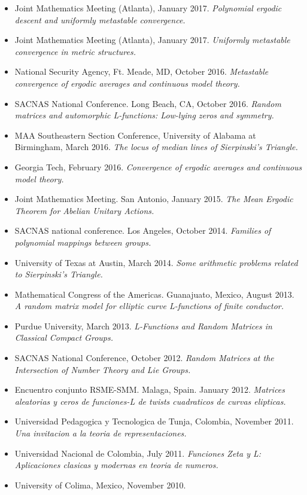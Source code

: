\documentclass[11pt,a4paper,ragged2e,withhyper]{altacv}
\begin{document}
{\begin{itemize}
\item Joint Mathematics Meeting (Atlanta), January 2017.
  \emph{Polynomial ergodic descent and uniformly metastable convergence.}
\item Joint Mathematics Meeting (Atlanta), January 2017.
  \emph{Uniformly metastable convergence in metric structures.}
\item National Security Agency, Ft. Meade, MD, October 2016.
  \emph{Metastable convergence of ergodic averages and continuous model theory.}
\item SACNAS National Conference. Long Beach, CA, October 2016.
  \emph{Random matrices and automorphic L-functions: Low-lying zeros and symmetry.}
\item MAA Southeastern Section Conference, University of Alabama at Birmingham, March 2016.
  \emph{The locus of median lines of Sierpinski's Triangle.}
\item Georgia Tech, February 2016.
  \emph{Convergence of ergodic averages and continuous model theory.}
\item Joint Mathematics Meeting. San Antonio, January 2015.
  \emph{The Mean Ergodic Theorem for Abelian Unitary Actions.}
\item SACNAS national conference. Los Angeles, October 2014.
  \emph{Families of polynomial mappings between groups.}
\item University of Texas at Austin, March 2014.
  \emph{Some arithmetic problems related to Sierpinski's Triangle.}
\item Mathematical Congress of the Americas. Guanajuato, Mexico, August 2013.
  \emph{A random matrix model for elliptic curve L-functions of finite conductor.}
\item Purdue University, March 2013.
  \emph{L-Functions and Random Matrices in Classical Compact Groups.}
\item SACNAS National Conference, October 2012.
  \emph{Random Matrices at the Intersection of Number Theory and Lie Groups.}
\item Encuentro conjunto RSME-SMM. Malaga, Spain. January 2012.
  \emph{Matrices aleatorias y ceros de funciones-L de twists cuadraticos de curvas elipticas.}
\item Universidad Pedagogica y Tecnologica de Tunja, Colombia, November 2011.
  \emph{Una invitacion a la teoria de representaciones.}
\item Universidad Nacional de Colombia, July 2011.
  \emph{Funciones Zeta y L: Aplicaciones clasicas y modernas en teoria de numeros.}
\item University of Colima, Mexico, November 2010.

\end{itemize}}
\end{document}
